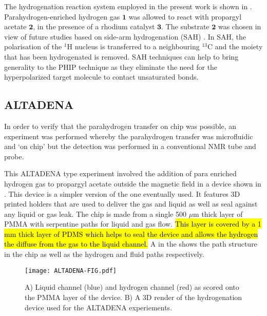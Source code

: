 The hydrogenation reaction system employed in the present work is shown in
.
Para\-hydrogen-en\-riched hydrogen gas $\mathbf{1}$ was
allowed to react with propargyl acetate $\mathbf{2}$, in the presence of
a rhodium catalyst $\mathbf{3}$. The substrate $\mathbf{2}$ was chosen in
view of future studies based on side-arm hydrogenation (SAH)
\cite{Reineri:2015he,cavallari201813,cavallari2015effects}. In SAH, the
polarisation of the $^1$H nucleus is transferred to a neighbouring $^13$C
and the moiety that has been hydrogenated is removed. SAH techniques can
help to bring generality to the PHIP technique as they eliminate the need for
the hyperpolarized target molecule to contact unsaturated bonds.

\subsection{ALTADENA}

In order to verify that the parahydrogen transfer on chip was possible, an
experiment was performed whereby the parahydrogen transfer was microfluidic
and ‘on chip’ but the detection was performed in a conventional NMR tube and probe.

This ALTADENA type experiment involved the addition of para enriched hydrogen
gas to propargyl acetate outside the magnetic field in a device shown in . This device
is a simpler version of the one eventually used.
It features 3D printed holders that are used to deliver the gas and liquid as
well as seal against any liquid or gas leak. The chip is made from a single 500
$\mu$m thick layer of PMMA with serpentine paths for liquid and gas flow. \hl{This
layer is covered by a 1 mm thick layer of PDMS which helps to seal the device and allows
the hydrogen the diffuse from the gas to the liquid channel.} A in the
 shows the path structure in the chip as well as the hydrogen and fluid paths
respectively.

\begin{figure}[ht]
  \begin{center}
  \texttt{[image: ALTADENA-FIG.pdf]}
  \end{center}
  \caption{A) Liquid channel (blue) and hydrogen channel (red) as scored
  onto the PMMA layer of the device. B) A 3D render of the hydrogenation device
  used for the ALTADENA experiements.}
  \label{fig:AltadenaChip}
\end{figure}

